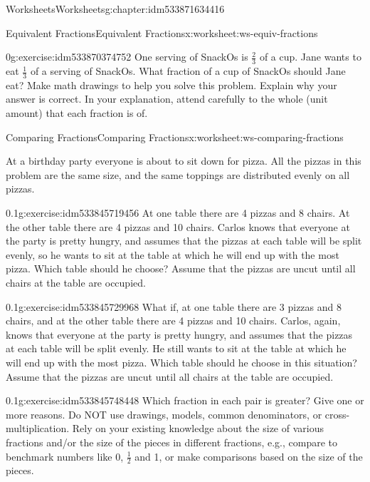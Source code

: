 \documentclass[twoside,11pt,]{book}
\begin{document}
\begin{chapterptx}{Worksheets}{}{Worksheets}{}{}{g:chapter:idm533871634416}
\begin{worksheet-section-numberless}{Equivalent Fractions}{}{Equivalent Fractions}{}{}{x:worksheet:ws-equiv-fractions}
\begin{divisionexercise}{5}{}{0}{g:exercise:idm533870374752}%
One serving of SnackOs is \(\frac{2}{3} \) of a cup. Jane wants to eat \(\frac{1}{3} \) of a serving of SnackOs. What fraction of a cup of SnackOs should Jane eat? Make math drawings to help you solve this problem. Explain why your answer is correct. In your explanation, attend carefully to the whole (unit amount) that each fraction is of.%
\end{divisionexercise}%
\end{worksheet-section-numberless}
\restoregeometry
%
%
\typeout{************************************************}
\typeout{************************************************}
%
\begin{worksheet-section-numberless}{Comparing Fractions}{}{Comparing Fractions}{}{}{x:worksheet:ws-comparing-fractions}
\begin{introduction}{}%
At a birthday party everyone is about to sit down for pizza.  All the pizzas in this problem are the same size, and the same toppings are distributed evenly on all pizzas.%
\end{introduction}%
\begin{divisionexercise}{1}{}{0.1}{g:exercise:idm533845719456}%
At one table there are 4 pizzas and 8 chairs.  At the other table there are 4 pizzas and 10 chairs.  Carlos knows that everyone at the party is pretty hungry, and assumes that the pizzas at each table will be split evenly, so he wants to sit at the table at which he will end up with the most pizza.  Which table should he choose?  Assume that the pizzas are uncut until all chairs at the table are occupied.%
\end{divisionexercise}%
\begin{divisionexercise}{2}{}{0.1}{g:exercise:idm533845729968}%
What if, at one table there are 3 pizzas and 8 chairs, and at the other table there are 4 pizzas and 10 chairs.  Carlos, again, knows that everyone at the party is pretty hungry, and assumes that the pizzas at each table will be split evenly.  He still wants to sit at the table at which he will end up with the most pizza.  Which table should he choose in this situation? Assume that the pizzas are uncut until all chairs at the table are occupied.%
\end{divisionexercise}%
\begin{divisionexercise}{3}{}{0.1}{g:exercise:idm533845748448}%
Which fraction in each pair is greater?  Give one or more reasons.  Do NOT use drawings, models, common denominators, or cross-multiplication.  Rely on your existing knowledge about the size of various fractions and\slash{}or the size of the pieces in different fractions, e.g., compare to benchmark numbers like 0, \(\frac{1}{2} \) and 1, or make comparisons based on the size of the pieces.%

\end{divisionexercise}
\end{worksheet-section-numberless}
\end{chapterptx}
\end{document}
